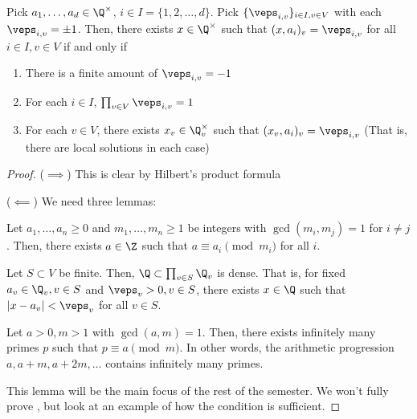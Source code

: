 \begin{thm}[][label=thm:hilbert-system]
    Pick $a_1,\dots,a_d \in \Q^\times$, $i \in I = \{1,2,\dots,d\}$. Pick $\{\veps_{i,v}\}_{i\in I,v\in V}$ with each $\veps_{i,v}=\pm1$. Then, there exists $x \in \Q^\times$ such that $(x,a_i)_{v}=\veps_{i,v}$ for all $i\in I,v\in V$ if and only if
    \begin{enumerate}
        \item There is a finite amount of $\veps_{i,v}=-1$
        \item For each $i \in I$, $\prod _{v \in V}\veps_{i,v}=1$
        \item For each $v \in V$, there exists $x_v \in \Q_v^\times$ such that $(x_v,a_i)_v=\veps_{i,v}$ (That is, there are local solutions in each case)
    \end{enumerate}
\end{thm}

\begin{proof}
    ($\implies$) This is clear by Hilbert's product formula

    ($\impliedby$) We need three lemmas:

    \begin{lem}
        Let $a_1,\dots,a_n \geq 0$ and $m_1,\dots,m_n \geq 1$ be integers with $\gcd (m_i,m_j) = 1$ for $i \neq j$. Then, there exists $a \in \Z$ such that $a \equiv a_i \pmod{m_i}$ for all $i$.
    \end{lem}

    \begin{lem}
        Let $S \subset V$ be finite. Then, $\Q \subset \prod_{v \in S}\Q_v$ is dense. That is, for fixed $a_v \in \Q_v,v\in S$ and $\veps_v >0,v\in S$, there exists $x \in \Q$ such that $|x-a_v| < \veps_v$ for all $v \in S$.
    \end{lem}

    \begin{lem}
        Let $a>0,m>1$ with $\gcd(a,m)=1$. Then, there exists infinitely many primes $p$ such that $p \equiv a \pmod m$. In other words, the arithmetic progression $a,a+m,a+2m,\dots$ contains infinitely many primes.
    \end{lem}
    This lemma will be the main focus of the rest of the semester. We won't fully prove , but look at an example of how the condition is sufficient.
\end{proof}

